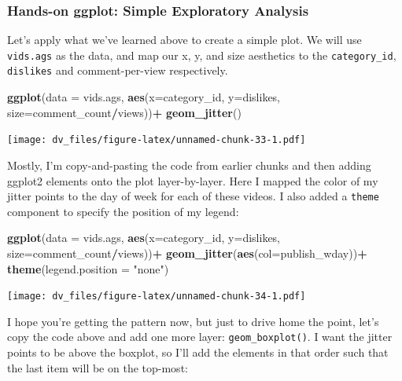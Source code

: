\documentclass[]{article}
\newenvironment{Shaded}{\begin{snugshade}}{\end{snugshade}}
\newcommand{\DataTypeTok}[1]{\textcolor[rgb]{0.13,0.29,0.53}{#1}}
\newcommand{\KeywordTok}[1]{\textcolor[rgb]{0.13,0.29,0.53}{\textbf{#1}}}
\newcommand{\NormalTok}[1]{#1}
\newcommand{\OperatorTok}[1]{\textcolor[rgb]{0.81,0.36,0.00}{\textbf{#1}}}
\newcommand{\StringTok}[1]{\textcolor[rgb]{0.31,0.60,0.02}{#1}}
\begin{document}
\hypertarget{hands-on-ggplot-simple-exploratory-analysis}{%
\subsubsection{Hands-on ggplot: Simple Exploratory
Analysis}\label{hands-on-ggplot-simple-exploratory-analysis}}

Let's apply what we've learned above to create a simple plot. We will
use \texttt{vids.ags} as the data, and map our x, y, and size aesthetics
to the \texttt{category\_id}, \texttt{dislikes} and comment-per-view
respectively.

\begin{Shaded}
\begin{Highlighting}[]
\KeywordTok{ggplot}\NormalTok{(}\DataTypeTok{data =}\NormalTok{ vids.ags, }\KeywordTok{aes}\NormalTok{(}\DataTypeTok{x=}\NormalTok{category_id, }\DataTypeTok{y=}\NormalTok{dislikes, }\DataTypeTok{size=}\NormalTok{comment_count}\OperatorTok{/}\NormalTok{views))}\OperatorTok{+}
\StringTok{  }\KeywordTok{geom_jitter}\NormalTok{()}
\end{Highlighting}
\end{Shaded}

\texttt{[image: dv\_files/figure-latex/unnamed-chunk-33-1.pdf]}

Mostly, I'm copy-and-pasting the code from earlier chunks and then
adding ggplot2 elements onto the plot layer-by-layer. Here I mapped the
color of my jitter points to the day of week for each of these videos. I
also added a \texttt{theme} component to specify the position of my
legend:

\begin{Shaded}
\begin{Highlighting}[]
\KeywordTok{ggplot}\NormalTok{(}\DataTypeTok{data =}\NormalTok{ vids.ags, }\KeywordTok{aes}\NormalTok{(}\DataTypeTok{x=}\NormalTok{category_id, }\DataTypeTok{y=}\NormalTok{dislikes, }\DataTypeTok{size=}\NormalTok{comment_count}\OperatorTok{/}\NormalTok{views))}\OperatorTok{+}
\StringTok{  }\KeywordTok{geom_jitter}\NormalTok{(}\KeywordTok{aes}\NormalTok{(}\DataTypeTok{col=}\NormalTok{publish_wday))}\OperatorTok{+}
\StringTok{  }\KeywordTok{theme}\NormalTok{(}\DataTypeTok{legend.position =} \StringTok{"none"}\NormalTok{)}
\end{Highlighting}
\end{Shaded}

\texttt{[image: dv\_files/figure-latex/unnamed-chunk-34-1.pdf]}

I hope you're getting the pattern now, but just to drive home the point,
let's copy the code above and add one more layer:
\texttt{geom\_boxplot()}. I want the jitter points to be above the
boxplot, so I'll add the elements in that order such that the last item
will be on the top-most:
\end{document}
